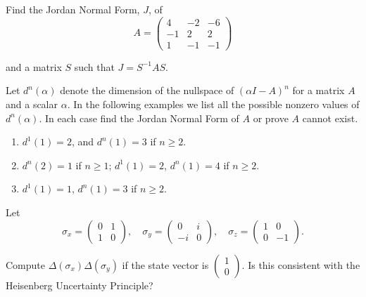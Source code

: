   \begin{exercise} 
    Find the Jordan Normal Form, $J$, of
    \[A = \begin{pmatrix} 
      4 & -2 & -6 \\
      -1 & 2 & 2 \\
      1 & -1 & -1
    \end{pmatrix}\]
    
    and a matrix $S$ such that $J = S^{-1}AS$.
  \end{exercise}

  \begin{exercise} 
    Let $d^n(\alpha)$ denote the dimension of the nullspace of $(\alpha I - A)^n$ for a matrix $A$ and a scalar $\alpha$. In the following examples we list all the possible nonzero values of $d^n(\alpha)$. In each case find the Jordan Normal Form of $A$ or prove $A$ cannot exist.
    \begin{enumerate}
      \item $d^1(1) = 2$, and $d^n(1) = 3$ if $n \geq 2$.
      \item $d^n(2) = 1$ if $n \geq 1$; $d^1(1) = 2$, $d^n(1) = 4$ if $n \geq 2$.
      \item $d^1(1) = 1$, $d^n(1) = 3$ if $n \geq 2$.
    \end{enumerate}
  \end{exercise}

  \begin{exercise} 
    Let
    \[\sigma_x = \begin{pmatrix} 0 & 1 \\ 1 & 0 \end{pmatrix}, \quad
    \sigma_y = \begin{pmatrix} 0 & i \\ -i & 0 \end{pmatrix}, \quad
    \sigma_z = \begin{pmatrix} 1 & 0 \\ 0 & -1 \end{pmatrix}.\]
    
    Compute $\Delta(\sigma_x)\Delta(\sigma_y)$ if the state vector is $\begin{pmatrix} 1 \\ 0 \end{pmatrix}$. Is this consistent with the Heisenberg Uncertainty Principle?
  \end{exercise}


